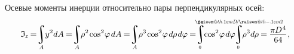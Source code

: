 \documentclass[14pt]{extarticle}
\makeatletter
\newcommand{\raisemath}[1]{\mathpalette{\raisem@th{#1}}}
\newcommand{\raisem@th}[3]{\raisebox{#1}{$#2#3$}}
\DeclareMathOperator*{\integral}{\scalerel*{\rotatebox{12}{$\!\textstyle\int\!$}}{\int}} %
\newcommand\cosine{\operatorname{cos}}
\makeatother
\begin{document}
Осевые моменты инерции относительно пары перпендикулярных осей:
\nopagebreak\vspace{-.5em}\[\begin{gathered}
\mathfrak{I}_{\hspace{-0.1ex}\scalebox{.8}{$z$}} \hspace{-0.25ex}
=\hspace{-0.6ex}
\integral_{A} \hspace{-0.6ex} y^2 dA \hspace{-0.1ex}
=\hspace{-0.6ex}
\integral_{A} \hspace{-0.6ex} \rho^2 \hspace{-.2ex} \cosine^{2} \hspace{-.33ex} \varphi \hspace{.25ex} dA \hspace{-0.1ex}
=\hspace{-0.6ex}
\integral_{A} \hspace{-0.6ex} \rho^3 \hspace{-.2ex} \cosine^{2} \hspace{-.33ex} \varphi \hspace{.25ex} d\hspace{-.1ex}\rho \hspace{.2ex} d\varphi \hspace{-0.1ex}
=\hspace{-0.6ex}
\integral_{\mathclap{\hspace{-.4ex} \scalebox{.6}{$ 0 $}}}^{\mathclap{\scalebox{.6}{$ 2\pi $}}} \hspace{-.7ex} \cosine^{2} \hspace{-.33ex} \varphi \hspace{.2ex} d\varphi \hspace{-.6ex}
\integral_{\mathclap{\hspace{-.4ex} \scalebox{.6}{$ 0 $}}}^{\mathclap{\scalebox{.6}{$ \raisemath{.1em}{D} \hspace{-.3ex} / \hspace{-.1ex} \raisemath{-.1em}{2} $}}} \hspace{-0.7ex} \rho^3 d\hspace{-.1ex}\rho \hspace{-0.1ex}
=\hspace{-0.1ex}
\displaystyle\frac{\raisebox{-0.18em}{$\pi \hspace{-0.1ex} D^{\hspace{.1ex}4}$}}{64}
\hspace{.1ex} ,
\\

\end{gathered}\]
\end{document}
